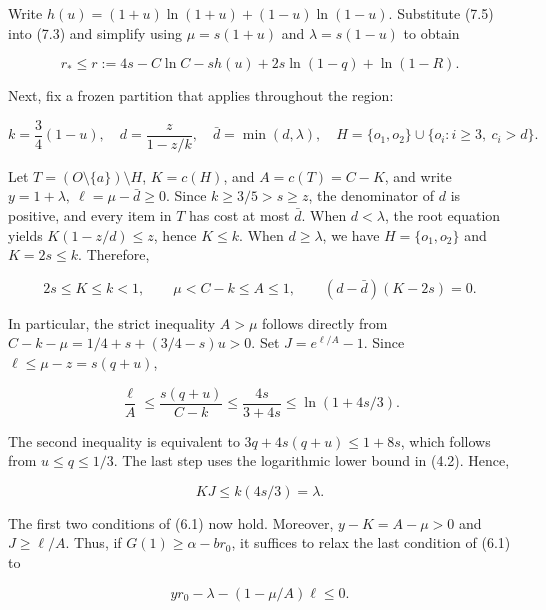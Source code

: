 \documentclass[11pt,a4paper]{article}
\begin{document}
Write $h(u)=(1+u)\ln(1+u)+(1-u)\ln(1-u)$. Substitute (7.5) into (7.3) and simplify using $\mu=s(1+u)$ and $\lambda=s(1-u)$ to obtain

\begin{equation}
r_*\le r:=4s-C\ln C-sh(u)+2s\ln(1-q)+\ln(1-R).
\tag{7.6}
\end{equation}

Next, fix a frozen partition that applies throughout the region:

\begin{equation}
k=\frac34(1-u),\quad d=\frac{z}{1-z/k},\quad
\bar d=\min(d,\lambda),\quad
H=\{o_1,o_2\}\cup\{o_i:i\ge3,\ c_i>d\}.
\tag{7.7}
\end{equation}

Let $T=(O\setminus\{a\})\setminus H$, $K=c(H)$, and $A=c(T)=C-K$, and write
$y=1+\lambda,\ \ell=\mu-\bar d\ge0$.
Since $k\ge3/5>s\ge z$, the denominator of $d$ is positive, and every item in $T$ has cost at most $\bar d$.
When $d<\lambda$, the root equation yields
$K(1-z/d)\le z$, hence $K\le k$. When $d\ge\lambda$, we have $H=\{o_1,o_2\}$ and $K=2s\le k$. Therefore,

\begin{equation}
2s\le K\le k<1,\qquad
\mu<C-k\le A\le1,\qquad
(d-\bar d)(K-2s)=0.
\tag{7.8}
\end{equation}

In particular, the strict inequality $A>\mu$ follows directly from $C-k-\mu=1/4+s+(3/4-s)u>0$. Set $J=e^{\ell/A}-1$. Since $\ell\le\mu-z=s(q+u)$,

\begin{equation}
\frac{\ell}{A}\le\frac{s(q+u)}{C-k}
\le\frac{4s}{3+4s}\le\ln(1+4s/3).
\tag{7.9}
\end{equation}

The second inequality is equivalent to $3q+4s(q+u)\le1+8s$, which follows from $u\le q\le1/3$. The last step uses the logarithmic lower bound in (4.2). Hence,

\begin{equation}
KJ\le k(4s/3)=\lambda.
\tag{7.10}
\end{equation}

The first two conditions of (6.1) now hold. Moreover, $y-K=A-\mu>0$ and $J\ge\ell/A$. Thus, if $G(1)\ge\alpha-br_0$, it suffices to relax the last condition of (6.1) to

\begin{equation}
yr_0-\lambda-(1-\mu/A)\ell\le0.
\tag{7.11}
\end{equation}
\end{document}
